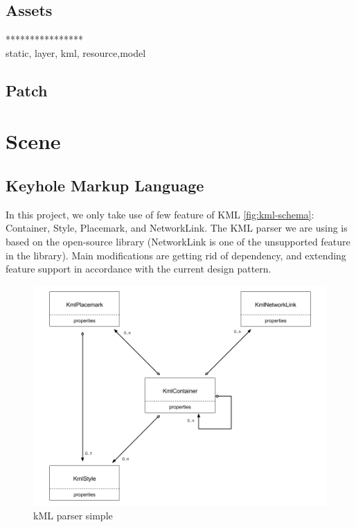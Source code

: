 \subsection{Assets}

****************\\
static, layer, kml, resource,model\\

\subsection{Patch}

\section{Scene}

\subsection{Keyhole Markup Language}

In this project, we only take use of few feature of KML \ref{fig:kml-schema}: Container, Style, Placemark,  and NetworkLink. The KML parser we are using is based on the open-source library  \parencite{Google.code-kml.2016} (NetworkLink is one of the unsupported feature in the library). Main modifications are getting rid of  dependency, and extending  feature support in accordance with the current design pattern.

\begin{figure}[H]
\caption[kml-parser-simple]{kML parser simple}
\label{fig:kml-parser-simple}
\centering
\includegraphics[width=\linewidth]{Figures/kml-parser-simple.png}
\decoRule
\end{figure}

